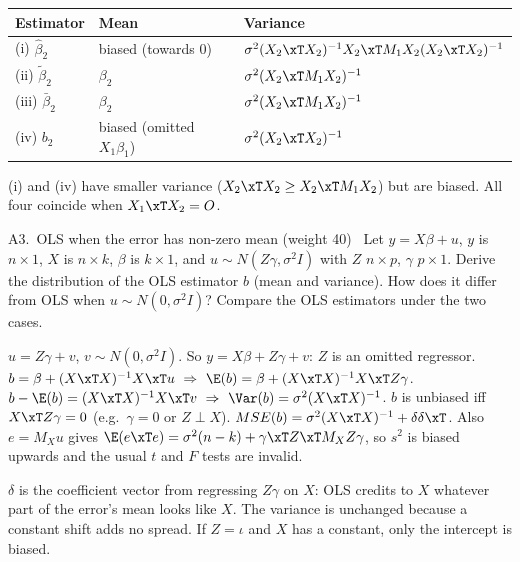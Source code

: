\begin{solbox}
\begin{center}
\renewcommand{\arraystretch}{1.2}\small
\begin{tabular}{lll}
\toprule
Estimator & Mean & Variance \\
\midrule
(i) $\hat\beta_{2}$ & biased (towards 0) & $\sigma^{2}(X_{2}\xT X_{2})^{-1}X_{2}\xT M_{1}X_{2}(X_{2}\xT X_{2})^{-1}$ \\
(ii) $\tilde\beta_{2}$ & $\beta_{2}$ & $\sigma^{2}(X_{2}\xT M_{1}X_{2})^{-1}$ \\
(iii) $\bar\beta_{2}$ & $\beta_{2}$ & $\sigma^{2}(X_{2}\xT M_{1}X_{2})^{-1}$ \\
(iv) $b_{2}$ & biased (omitted $X_{1}\beta_{1}$) & $\sigma^{2}(X_{2}\xT X_{2})^{-1}$ \\
\bottomrule
\end{tabular}
\end{center}
(i) and (iv) have smaller variance ($X_{2}\xT X_{2}\ge X_{2}\xT M_{1}X_{2}$) but are biased.
All four coincide when $X_{1}\xT X_{2}=O$.
\end{solbox}

\begin{qbox}{A3.\ OLS when the error has non-zero mean \quad(weight 40)}{\must\ }
Let $y = X\beta + u$, $y$ is $n\times1$, $X$ is $n\times k$, $\beta$ is $k\times1$, and
$u\sim N(Z\gamma,\sigma^{2}I)$ with $Z$ $n\times p$, $\gamma$ $p\times1$. Derive the distribution of
the OLS estimator $b$ (mean and variance). How does it differ from OLS when $u\sim N(0,\sigma^{2}I)$?
Compare the OLS estimators under the two cases.
\end{qbox}
\begin{solbox}
 $u = Z\gamma + v$, $v\sim N(0,\sigma^{2}I)$. So $y = X\beta + Z\gamma + v$:
$Z$ is an omitted regressor.
 $b = \beta + (X\xT X)^{-1}X\xT u\ \Rightarrow\ \E(b) = \beta + (X\xT X)^{-1}X\xT Z\gamma$.
 $b - \E(b) = (X\xT X)^{-1}X\xT v\ \Rightarrow\ \Var(b) = \sigma^{2}(X\xT X)^{-1}$.
 $b$ is unbiased iff $X\xT Z\gamma=0$ (e.g.\ $\gamma=0$ or $Z\perp X$).
$MSE(b)=\sigma^{2}(X\xT X)^{-1}+\delta\delta\xT$. Also $e=M_{X}u$ gives
$\E(e\xT e)=\sigma^{2}(n-k)+\gamma\xT Z\xT M_{X}Z\gamma$, so $s^{2}$ is biased upwards and the usual $t$ and $F$
tests are invalid.
\begin{why}\Why $\delta$ is the coefficient vector from regressing $Z\gamma$ on $X$: OLS credits to $X$ whatever
part of the error's mean looks like $X$. The variance is unchanged because a constant shift adds no spread.
If $Z=\iota$ and $X$ has a constant, only the intercept is biased.\end{why}
\end{solbox}

